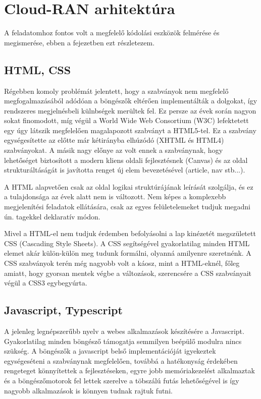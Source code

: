 \chapter{Cloud-RAN arhitektúra}\label{sect:CloudArch}

\hspace{2mm} A feladatomhoz fontos volt a megfelelő kódolási eszközök felmérése és megismerése, ebben a fejezetben ezt részletezem. 

\section{HTML, CSS}
\hspace{2mm} Régebben komoly problémát jelentett, hogy a szabványok nem megfelelő megfogalmazásából adódóan a böngészők eltérően implementálták a dolgokat, így rendszeres megjelnésbeli külnbségek merültek fel. Ez persze az évek során nagyon sokat finomodott, míg végül a World Wide Web Consortium (W3C) lefektetett egy úgy látszik megfelelően magalapozott szabványt a HTML5-tel. Ez a szabvány egységesítette az előtte már kétirányba elhúzódó (XHTML és HTML4) szabványokat. A másik nagy előnye az volt ennek a szabványnak, hogy lehetőséget biztosított a modern kliens oldali fejlesztésnek (Canvas) és az oldal strukturáltáságát is javította renget új elem bevezetésével (article, nav stb...).

A HTML alapvetően csak az oldal logikai struktúrájának leírását szolgálja, és ez a tulajdonsága az évek alatt nem is változott. Nem képes a komplexebb megjelenítési feladatok ellátására, csak az egyes felületelemeket tudjuk megadni ún. tagekkel deklaratív módon.

Mivel a HTML-el nem tudjuk érdemben befolyásolni a lap kinézetét megszületett CSS (Cascading Style Sheets). A CSS segítségével gyakorlatilag minden HTML elemet akár külön-külön meg tudunk formálni, olyanná amilyenre szeretnénk. A CSS szabványok terén még nagyobb volt a káosz, mint a HTML-eknél, főleg amiatt, hogy gyorsan mentek végbe a változások, szerencsére a CSS szabványait végül a CSS3 egybegyúrta.  

\section{Javascript, Typescript}
\hspace{2mm} A jelenleg legnépszerűbb nyelv a webes alkalmazások készítésére a Javascript. Gyakorlatilag minden böngésző támogatja semmilyen beépülő modulra nincs szükség. A böngészők a javascript belső implementációját igyekeztek egységeséteni a szabványnak megfelelően, továbbá a hatékonyság érdekében rengeteget könnyítettek a fejlesztéseken, egyre jobb memóriakezelést alkalmaztak és a böngészőmotorok fel lettek szerelve a töbszálú futás lehetőségével is így nagyobb alkalmazások is könnyen tudnak rajtuk futni.

